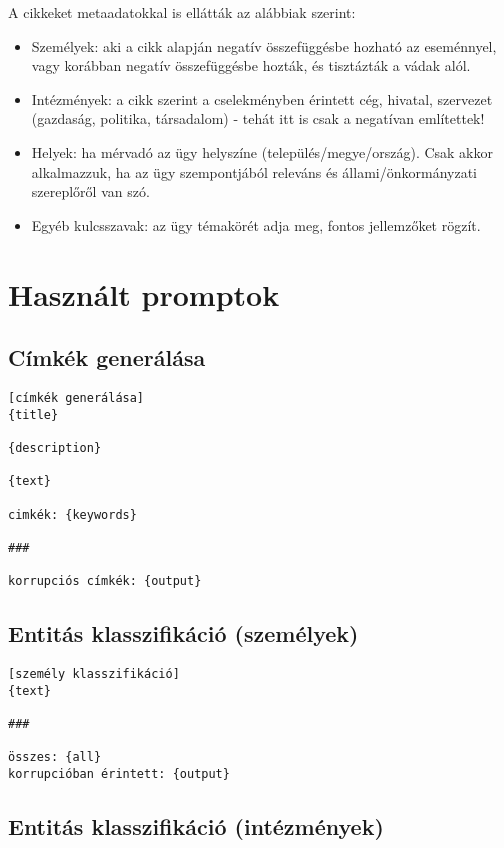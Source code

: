 A cikkeket metaadatokkal is ellátták az alábbiak szerint:

\begin{itemize}
	\item Személyek: aki a cikk alapján negatív összefüggésbe hozható az eseménnyel, vagy korábban negatív összefüggésbe hozták, és tisztázták a vádak alól.
	\item Intézmények: a cikk szerint a cselekményben érintett cég, hivatal, szervezet (gazdaság, politika, társadalom) - tehát itt is csak a negatívan említettek!
	\item Helyek: ha mérvadó az ügy helyszíne (település/megye/ország). Csak akkor alkalmazzuk, ha az ügy szempontjából releváns és állami/önkormányzati szereplőről van szó.
	\item Egyéb kulcsszavak: az ügy témakörét adja meg, fontos jellemzőket rögzít. 
\end{itemize}

\clearpage\section{Használt promptok}

\subsection{Címkék generálása}

\begin{verbatim}
[címkék generálása]
{title}

{description}

{text}

cimkék: {keywords}

###

korrupciós címkék: {output}
\end{verbatim}

\subsection{Entitás klasszifikáció (személyek)}

\begin{verbatim}
[személy klasszifikáció]
{text}

###

összes: {all}
korrupcióban érintett: {output}
\end{verbatim}

\subsection{Entitás klasszifikáció (intézmények)}

